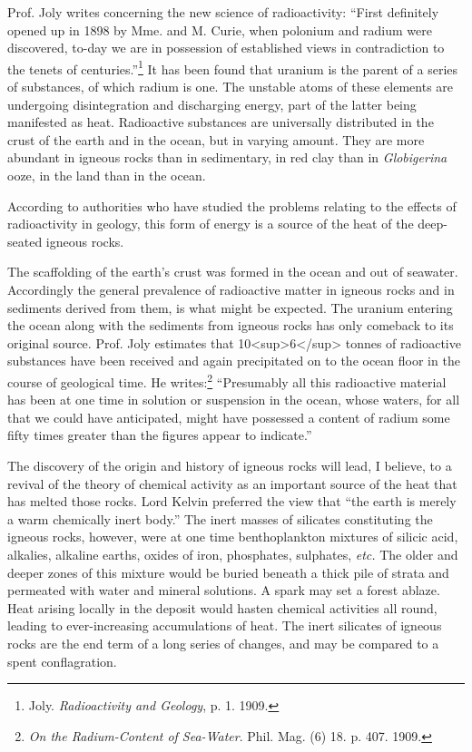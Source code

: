 \documentclass[a4paper, 12pt, oneside]{article}
\begin{document}
Prof. Joly writes concerning the new science of radioactivity: ``First definitely opened up in 1898 by Mme. and M. Curie, when polonium and radium were discovered, to-day we are in possession of established views in contradiction to the tenets of centuries.''\footnote{Joly. \emph{Radioactivity and Geology}, p. 1. 1909.} It has been found that uranium is the parent of a series of substances, of which radium is one. The unstable atoms of these elements are undergoing disintegration and discharging energy, part of the latter being manifested as heat. Radioactive substances are universally distributed in the crust of the earth and in the ocean, but in varying amount. They are more abundant in igneous rocks than in sedimentary, in red clay than in \emph{Globigerina} ooze, in the land than in the ocean.

According to authorities who have studied the problems relating to the effects of radioactivity in geology, this form of energy is a source of the heat of the deep-seated igneous rocks.

The scaffolding of the earth's crust was formed in the ocean and out of seawater. Accordingly the general prevalence of radioactive matter in igneous rocks and in sediments derived from them, is what might be expected. The uranium entering the ocean along with the sediments from igneous rocks has only comeback to its original source. Prof. Joly estimates that 10<sup>6</sup> tonnes of radioactive substances have been received and again precipitated on to the ocean floor in the course of geological time. He writes:\footnote{\emph{On the Radium-Content of Sea-Water}. Phil. Mag. (6) 18. p. 407. 1909.} ``Presumably all this radioactive material has been at one time in solution or suspension in the ocean, whose waters, for all that we could have anticipated, might have possessed a content of radium some fifty times greater than the figures appear to indicate.''

The discovery of the origin and history of igneous rocks will lead, I believe, to a revival of the theory of chemical activity as an important source of the heat that has melted those rocks. Lord Kelvin preferred the view that ``the earth is merely a warm chemically inert body.'' The inert masses of silicates constituting the igneous rocks, however, were at one time benthoplankton mixtures of silicic acid, alkalies, alkaline earths, oxides of iron, phosphates, sulphates, \emph{etc.} The older and deeper zones of this mixture would be buried beneath a thick pile of strata and permeated with water and mineral solutions. A spark may set a forest ablaze. Heat arising locally in the deposit would hasten chemical activities all round, leading to ever-increasing accumulations of heat. The inert silicates of igneous rocks are the end term of a long series of changes, and may be compared to a spent conflagration.
\end{document}
